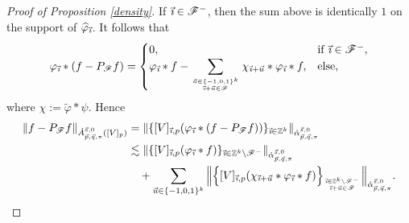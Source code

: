 \documentclass[11pt, reqno]{amsart}
\theoremstyle{definition}
\theoremstyle{remark}
\numberwithin{equation}{section}
\newcommand{\Fs}{\mathscr F}
\newcommand{\Z}{\mathbb Z}
\newcommand{\vi}{\vec{\textit{\i}}}
\newcommand{\vu}{\vec u}
\newcommand{\Red}[3]{[#1]_{#2,#3}}
\newcommand{\Norm}[2]{\|#1\|_{#2}}
\newcommand{\BNorm}[2]{\Big\|#1\Big\|_{#2}}
\begin{document}
\begin{proof}[Proof of Proposition \ref{density}]
If $\vi\in\Fs^-$, then the sum above is identically $1$ on the support of $\widehat{\varphi}_{\vi}$. It follows that
\begin{equation*}
\varphi_{\vi}*(f-P_{\Fs} f)
=\begin{cases} 0, & \text{if }\vi\in\Fs^-, \\ \displaystyle
\varphi_{\vi}*f-\sum_{\genfrac{}{}{0pt}{}{\vu\in\{-1,0,1\}^k}{\vi+\vu\in\Fs}}\chi_{\vi+\vu}*\varphi_{\vi}*f, & \text{else},
\end{cases}
\end{equation*}
where $\chi:=\widetilde\varphi*\psi$.
Hence
\begin{equation}\label{2termsRHS}
\begin{split}
\Norm{f-P_{\Fs}f}{\dot A_{\vec p,\vec q,\pi}^{\vec s,0}([V]_p)}
&=\Norm{\{\Red{V}{\vi}{p}(\varphi_{\vi}*(f-P_{\Fs} f))\}_{\vi\in\Z^k}}{\dot \alpha_{\vec p,\vec q,\pi}^{\vec s,0}} \\
&\lesssim\Norm{\{\Red{V}{\vi}{p}(\varphi_{\vi}*f)\}_{\vi\in\Z^k\setminus\Fs^-}}{\dot \alpha_{\vec p,\vec q,\pi}^{\vec s,0}} \\
&\quad+\sum_{\vu\in\{-1,0,1\}^k}\BNorm{\Big\{\Red{V}{\vi}{p}(\chi_{\vi+\vu}*\varphi_{\vi}*f)\Big\}_{\genfrac{}{}{0pt}{}{\vi\in\Z^k\setminus\Fs^-}{\vi+\vu\in\Fs}}}{\dot \alpha_{\vec p,\vec q,\pi}^{\vec s,0}}.
\end{split}
\end{equation}


\end{proof}
\end{document}
